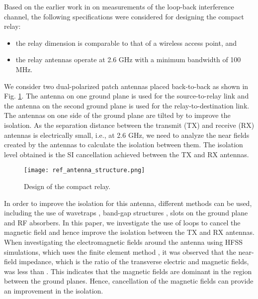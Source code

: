 \documentclass[conference,twoside,letterpaper,10pt]{IEEEtran}
\begin{document}
Based on the earlier work in \cite{RefWorks:13} on measurements of the loop-back interference channel, the following specifications were considered for designing the compact relay:
\begin{itemize}
\item the relay dimension is comparable to that of a wireless access point, and
\item the relay antennas operate at 2.6 GHz with a minimum bandwidth of 100 MHz.
\end{itemize}
We consider two dual-polarized patch antennas placed back-to-back as shown in Fig. \ref{fig:relay_reference_antenna}. The antenna on one ground plane is used for the source-to-relay link and the antenna on the second ground plane is used for the relay-to-destination link. The antennas on one side of the ground plane are tilted by  to improve the isolation. As the separation distance between the transmit (TX) and receive (RX) antennas is electrically small, i.e.,  at 2.6 GHz, we need to analyze the near fields created by the antennas to calculate the isolation between them. The isolation level obtained is the SI cancellation achieved between the TX and RX antennas.

\begin{figure}[!t]
\centering
\texttt{[image: ref\_antenna\_structure.png]}
\caption{Design of the compact relay.}
\label{fig:relay_reference_antenna}
\vspace{-4mm}
\end{figure}


In order to improve the isolation for this antenna, different methods can be used, including the use of wavetraps \cite{wavetrap}, band-gap structures \cite{ebg}, slots on the ground plane \cite{slots} and RF absorbers. In this paper, we investigate the use of loops to cancel the magnetic field and hence improve the isolation between the TX and RX antennas. When investigating the electromagnetic fields around the antenna using HFSS simulations, which uses the finite element method \cite{hfss}, it was observed that the near-field  impedance, which is the ratio of the transverse electric and magnetic fields, was less than . This indicates that the magnetic fields are dominant in the region between the ground planes. Hence, cancellation of the magnetic fields can provide an improvement in the isolation.
\end{document}
